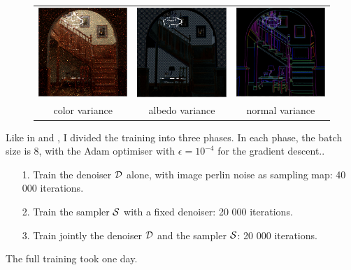 \documentclass{classeENS}
\begin{document}
\begin{figure}[H]
    \centering
    \begin{tabular}{ccc}
    \includegraphics[width=45mm]{image/networkInput/colorV.png}
    & \includegraphics[width=45mm]{image/networkInput/albedoV.png}
    & \includegraphics[width=45mm]{image/networkInput/normalV.png} \\
    color variance & albedo variance & normal variance
\end{tabular}
\end{figure}

Like in \cite{kuznetsov2018deep} and \cite{10.1145/3550454.3555515}, I divided the training
into three phases. In each phase, the batch size is 8, with the Adam optimiser \cite{kingma2017adam}
with $\epsilon = 10^{-4}$ for the gradient descent..
\begin{itemize}
    \item[1.] Train the denoiser $\mathcal D$ alone, with image perlin noise as sampling map: 
                40 000 iterations.
    \item[2.] Train the sampler $\mathcal S$ with a fixed denoiser: 20 000 iterations.
    \item[3.] Train jointly the denoiser $\mathcal D$ and the sampler $\mathcal S$: 20 000 iterations.
\end{itemize}
The full training took one day.
\end{document}
